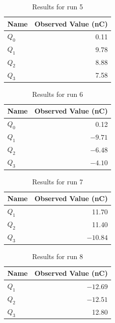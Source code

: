 %
\begin{table}[ht]
	\centering
	\begin{tabular}{|l|r|}
		\hline
		Name & Observed Value (nC) \\
		\hline
		$Q_{0}$ & 0.11 \\
		$Q_{1}$ & 9.78 \\
		$Q_{2}$ & 8.88 \\
		$Q_{3}$ & 7.58 \\
		\hline
	\end{tabular}
	\caption{Results for run 5}
	\label{table_01_run_5}
\end{table}
%
\begin{table}[ht]
	\centering
	\begin{tabular}{|l|r|}
		\hline
		Name & Observed Value (nC) \\
		\hline
		$Q_{0}$ & 0.12 \\
		$Q_{1}$ & $-9.71$ \\
		$Q_{2}$ & $-6.48$ \\
		$Q_{3}$ & $-4.10$ \\
		\hline
	\end{tabular}
	\caption{Results for run 6}
	\label{table_01_run_6}
\end{table}
%
\begin{table}[ht]
	\centering
	\begin{tabular}{|l|r|}
		\hline
		Name & Observed Value (nC) \\
		\hline
		$Q_{1}$ & 11.70 \\
		$Q_{2}$ & 11.40 \\
		$Q_{3}$ & $-10.84$ \\
		\hline
	\end{tabular}
	\caption{Results for run 7}
	\label{table_01_run_7}
\end{table}
%
\begin{table}[ht]
	\centering
	\begin{tabular}{|l|r|}
		\hline
		Name & Observed Value (nC) \\
		\hline
		$Q_{1}$ & $-12.69$ \\
		$Q_{2}$ & $-12.51$ \\
		$Q_{3}$ & 12.80 \\
		\hline
	\end{tabular}
	\caption{Results for run 8}
	\label{table_01_run_8}
\end{table}
%
\FloatBarrier
\newpage
